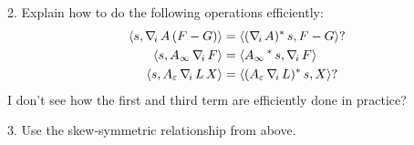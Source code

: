 2. Explain how to do the following operations efficiently:
\begin{alignat*}{3}
\langle s, \nabla_{\!i}\, A \, (F-  G) \rangle &= \langle (\nabla_{\!i}\, A)^* \, s,  F-  G \rangle ? \\
\langle s, A_\infty \, \nabla_{\!i}\, F \rangle &= \langle A_\infty \,^* \, s,  \nabla_{\!i}\, F \rangle \\
\langle s, A_\varepsilon \, \nabla_{\!i}\, L \, X \rangle &= \langle (A_\varepsilon\, \nabla_{\!i}\, L)^* \, s,  X \rangle ?
\end{alignat*}
I don't see how the first and third term are efficiently done in practice?

3. Use the skew-symmetric relationship from above.
